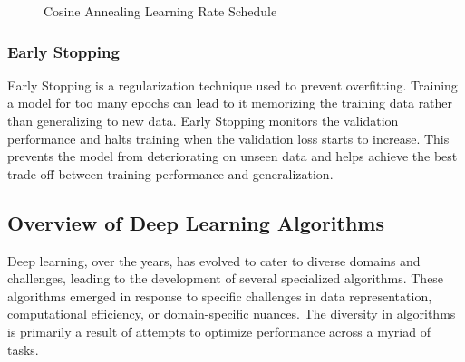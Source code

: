 \begin{figure}[h!]
    \centering
    \caption{Cosine Annealing Learning Rate Schedule}
    \label{fig:exponential}
\end{figure}


\subsubsection*{Early Stopping}

Early Stopping is a regularization technique used to prevent overfitting. Training a model for too many epochs can lead to it memorizing the training data rather than generalizing to new data. Early Stopping monitors the validation performance and halts training when the validation loss starts to increase. This prevents the model from deteriorating on unseen data and helps achieve the best trade-off between training performance and generalization.


\subsection{Overview of Deep Learning Algorithms}

Deep learning, over the years, has evolved to cater to diverse domains and challenges, leading to the development of several specialized algorithms. These algorithms emerged in response to specific challenges in data representation, computational efficiency, or domain-specific nuances. The diversity in algorithms is primarily a result of attempts to optimize performance across a myriad of tasks.\\

